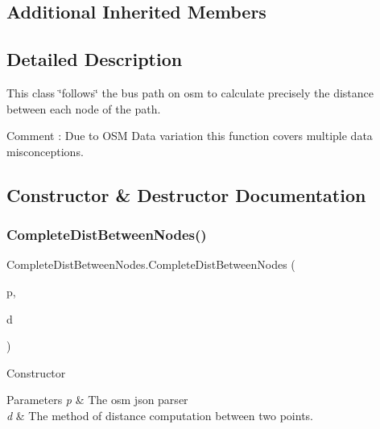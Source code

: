 \subsection*{Additional Inherited Members}


\subsection{Detailed Description}
This class \char`\"{}follows\char`\"{} the bus path on osm to calculate precisely the distance between each node of the path. 

Comment \+: Due to O\+SM Data variation this function covers multiple data misconceptions.

\subsection{Constructor \& Destructor Documentation}
\mbox{\label{classCompleteDistBetweenNodes_a7a1eeaedd4ae2ba2fae2405e05b14ffd}} 
\subsubsection{\texorpdfstring{Complete\+Dist\+Between\+Nodes()}{CompleteDistBetweenNodes()}\hspace{0.1cm}{\footnotesize\ttfamily [1/2]}}
{\footnotesize\ttfamily Complete\+Dist\+Between\+Nodes.\+Complete\+Dist\+Between\+Nodes (\begin{DoxyParamCaption}\item[{\hyperlink{classParser}{Parser}}]{p,  }\item[{\hyperlink{classDistanceComputation}{Distance\+Computation}}]{d }\end{DoxyParamCaption})\hspace{0.3cm}{\ttfamily [inline]}}



Constructor 


\begin{DoxyParams}{Parameters}
{\em p} & The osm json parser\\
\hline
{\em d} & The method of distance computation between two points.\\
\hline
\end{DoxyParams}
\mbox{\label{classCompleteDistBetweenNodes_a522b59987a5947f2e623761df4e1bcf5}} 
